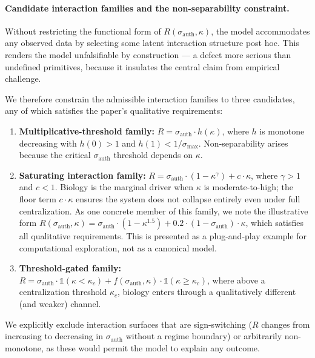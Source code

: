 \documentclass[11pt, a4paper]{article}
\theoremstyle{remark}
\begin{document}
\paragraph{Candidate interaction families and the non-separability constraint.} Without restricting the functional form of $R(\sigma_{\text{auth}}, \kappa)$, the model accommodates any observed data by selecting some latent interaction structure post hoc. This renders the model unfalsifiable by construction --- a defect more serious than undefined primitives, because it insulates the central claim from empirical challenge.

We therefore constrain the admissible interaction families to three candidates, any of which satisfies the paper's qualitative requirements:

\begin{enumerate}
\item \textbf{Multiplicative-threshold family:} $R = \sigma_{\text{auth}} \cdot h(\kappa)$, where $h$ is monotone decreasing with $h(0) > 1$ and $h(1) < 1/\sigma_{\max}$. Non-separability arises because the critical $\sigma_{\text{auth}}$ threshold depends on $\kappa$.

\item \textbf{Saturating interaction family:} $R = \sigma_{\text{auth}} \cdot (1 - \kappa^\gamma) + c \cdot \kappa$, where $\gamma > 1$ and $c < 1$. Biology is the marginal driver when $\kappa$ is moderate-to-high; the floor term $c \cdot \kappa$ ensures the system does not collapse entirely even under full centralization. As one concrete member of this family, we note the illustrative form $R(\sigma_{\text{auth}}, \kappa) = \sigma_{\text{auth}} \cdot (1 - \kappa^{1.5}) + 0.2 \cdot (1 - \sigma_{\text{auth}}) \cdot \kappa$, which satisfies all qualitative requirements. This is presented as a plug-and-play example for computational exploration, not as a canonical model.

\item \textbf{Threshold-gated family:} $R = \sigma_{\text{auth}} \cdot \mathbb{1}(\kappa < \kappa_c) + f(\sigma_{\text{auth}}, \kappa) \cdot \mathbb{1}(\kappa \geq \kappa_c)$, where above a centralization threshold $\kappa_c$, biology enters through a qualitatively different (and weaker) channel.
\end{enumerate}

We explicitly exclude interaction surfaces that are sign-switching ($R$ changes from increasing to decreasing in $\sigma_{\text{auth}}$ without a regime boundary) or arbitrarily non-monotone, as these would permit the model to explain any outcome.
\end{document}
